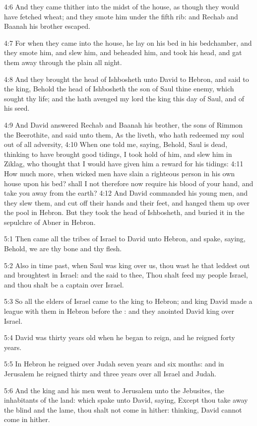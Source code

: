 4:6 And they came thither into the midst of the house, as though they
would have fetched wheat; and they smote him under the fifth rib: and
Rechab and Baanah his brother escaped.

4:7 For when they came into the house, he lay on his bed in his
bedchamber, and they smote him, and slew him, and beheaded him, and
took his head, and gat them away through the plain all night.

4:8 And they brought the head of Ishbosheth unto David to Hebron, and
said to the king, Behold the head of Ishbosheth the son of Saul thine
enemy, which sought thy life; and the \LORD hath avenged my lord the
king this day of Saul, and of his seed.

4:9 And David answered Rechab and Baanah his brother, the sons of
Rimmon the Beerothite, and said unto them, As the \LORD liveth, who
hath redeemed my soul out of all adversity, 4:10 When one told me,
saying, Behold, Saul is dead, thinking to have brought good tidings, I
took hold of him, and slew him in Ziklag, who thought that I would
have given him a reward for his tidings: 4:11 How much more, when
wicked men have slain a righteous person in his own house upon his
bed? shall I not therefore now require his blood of your hand, and
take you away from the earth?  4:12 And David commanded his young men,
and they slew them, and cut off their hands and their feet, and hanged
them up over the pool in Hebron. But they took the head of Ishbosheth,
and buried it in the sepulchre of Abner in Hebron.

5:1 Then came all the tribes of Israel to David unto Hebron, and
spake, saying, Behold, we are thy bone and thy flesh.

5:2 Also in time past, when Saul was king over us, thou wast he that
leddest out and broughtest in Israel: and the \LORD said to thee, Thou
shalt feed my people Israel, and thou shalt be a captain over Israel.

5:3 So all the elders of Israel came to the king to Hebron; and king
David made a league with them in Hebron before the \LORD: and they
anointed David king over Israel.

5:4 David was thirty years old when he began to reign, and he reigned
forty years.

5:5 In Hebron he reigned over Judah seven years and six months: and in
Jerusalem he reigned thirty and three years over all Israel and Judah.

5:6 And the king and his men went to Jerusalem unto the Jebusites, the
inhabitants of the land: which spake unto David, saying, Except thou
take away the blind and the lame, thou shalt not come in hither:
thinking, David cannot come in hither.

